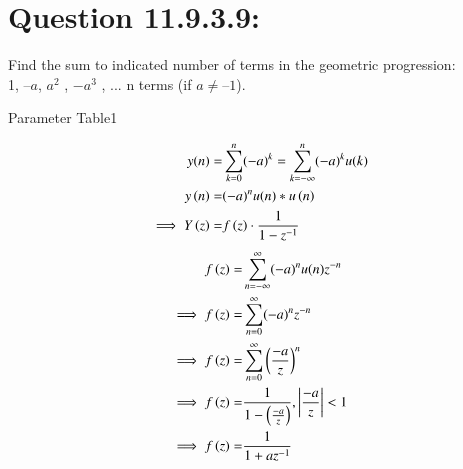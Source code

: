 \documentclass[journal,12pt,twocolumn]{IEEEtran}
\theoremstyle{remark}
\begin{document}



\maketitle

\newpage


\bigskip
 
\renewcommand{\thefigure}{\theenumi}
\renewcommand{\thetable}{\theenumi}
\section*{Question 11.9.3.9:}
Find the sum to indicated number of terms in the geometric progression:\\

1, $– a$, $a^2$
, $-a^3$
, ... n terms (if $a \neq – 1$).\\
\solution

\begin{table}[ht]
    \centering
    \def\arraystretch{1.5}
    
    \caption{Parameter Table1}
    \label{tab:10.5.3.1}
\end{table}
\begin{align}
y(n) =& \sum_{k=0}^{n} (-a)^k = \sum_{k=-\infty}^{n} (-a)^k u(k) \\
y\left(n\right)= &{(-a)^n}u(n)*u\left(n\right)\\
\implies Y\left(z\right)= &f\left(z\right)\cdot\frac{1}{1-z^{-1}}
\end{align}
 \begin{align}
     f\left(z\right)=&\sum_{n=-\infty}^{\infty} (-a)^n u(n) z^{-n}\\
     \implies f\left(z\right)=&\sum_{n=0}^{\infty} (-a)^n z^{-n}\\
    \implies f\left(z\right)=&\sum_{n=0}^{\infty} \left( \frac{-a}{z} \right)^n\\
   \implies  f\left(z\right)=&\frac{1}{1-\left(\frac{-a}{z}\right)},\left| \frac{-a}{z} \right| < 1
 \\
   \implies  f\left(z\right)=&\frac{1}{1+az^{-1}}
\end{align}
\end{document}

